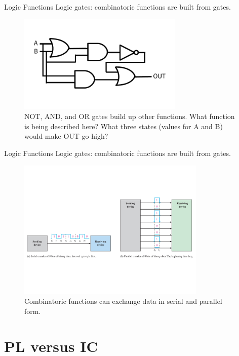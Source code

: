 \documentclass{beamer}
\begin{document}
\begin{frame}{Logic Functions}
Logic gates: combinatoric functions are built from gates.
\begin{figure}
\includegraphics[width=0.7\textwidth]{operators2.pdf}
\caption{\label{fig:digital5_2} NOT, AND, and OR gates build up other functions.  What function is being described here?  What three states (values for A and B) would make OUT go high?}
\end{figure}
\end{frame}

\begin{frame}{Logic Functions}
Logic gates: combinatoric functions are built from gates.
\begin{figure}
\includegraphics[width=0.8\textwidth,trim=0cm 4cm 0cm 4cm,clip=true]{digital5.pdf}
\caption{\label{fig:digital6} Combinatoric functions can exchange data in serial and parallel form.}
\end{figure}
\end{frame}

\section{PL versus IC}
\end{document}
